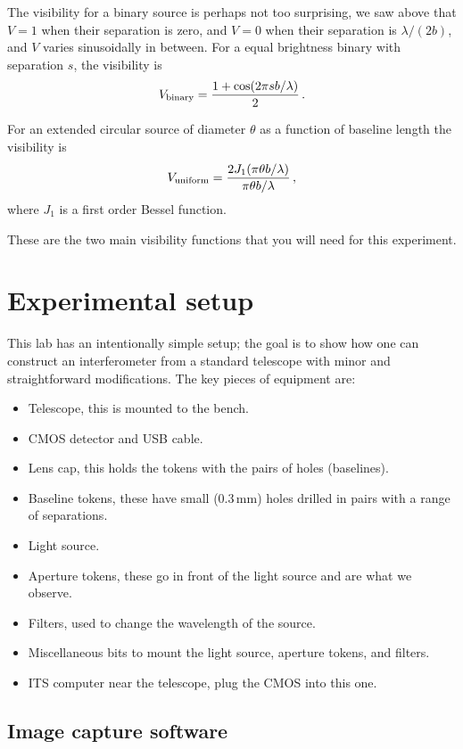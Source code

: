 \documentclass[11pt]{article}
\begin{document}
The visibility for a binary source is perhaps not too surprising, we saw above that $V=1$ when their separation is zero, and $V=0$ when their separation is $\lambda/(2b)$, and $V$ varies sinusoidally in between. For a equal brightness binary with separation $s$, the visibility is
\begin{equation}
    V_{\rm binary} = \frac{1 + \cos ( 2 \pi s b / \lambda )}{2} \, .
\end{equation}

For an extended circular source of diameter $\theta$ as a function of baseline length the visibility is
\begin{equation}
    V_{\rm uniform} = \frac{2 J_1(\pi \theta b / \lambda)}{\pi \theta b / \lambda} \, ,
\end{equation}
where $J_1$ is a first order Bessel function.

These are the two main visibility functions that you will need for this experiment.

\clearpage
\section{Experimental setup}

This lab has an intentionally simple setup; the goal is to show how one can construct an interferometer from a standard telescope with minor and straightforward modifications. The key pieces of equipment are:
\begin{itemize}
    \item Telescope, this is mounted to the bench.
    \item CMOS detector and USB cable.
    \item Lens cap, this holds the tokens with the pairs of holes (baselines).
    \item Baseline tokens, these have small (0.3\,mm) holes drilled in pairs with a range of separations.
    \item Light source.
    \item Aperture tokens, these go in front of the light source and are what we observe.
    \item Filters, used to change the wavelength of the source.
    \item Miscellaneous bits to mount the light source, aperture tokens, and filters.
    \item ITS computer near the telescope, plug the CMOS into this one.
\end{itemize}

\subsection{Image capture software}\label{sec:software}
\end{document}
